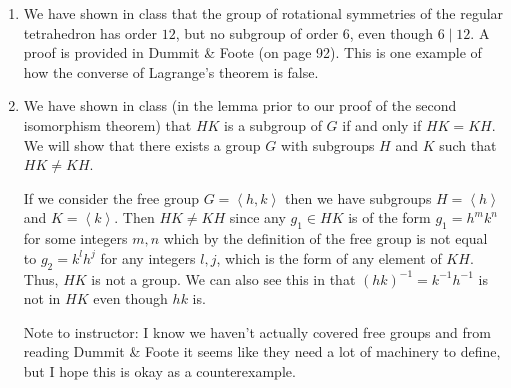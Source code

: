 \documentclass[12 pt, letterpaper]{hmcpset}
\begin{document}
\begin{solution}
\begin{enumerate}
			Since $H \trianglelefteq G$, $G/H$ is a group with the standard binary operation. Consider the projection $\pi : G \to G/H$ by $g \mapsto gH$. Notice that $gH = H = 1_{G/H}$ if and only if $g \in H$. Thus $\ker \pi = H$.
		\item {} 

			We have shown in class that the group of rotational symmetries of the regular tetrahedron has order $12$, but no subgroup of order $6$, even though $6 \mid 12$. A proof is provided in Dummit \& Foote (on page 92). This is one example of how the converse of Lagrange's theorem is false.
		\item {} 

			We have shown in class (in the lemma prior to our proof of the second isomorphism theorem) that $HK$ is a subgroup of $G$ if and only if $HK = KH$. We will show that there exists a group $G$ with subgroups $H$ and $K$ such that $HK \neq KH$. 

			If we consider the free group $G = \left < h, k \right >$ then we have subgroups $H = \left < h \right >$ and $K = \left < k \right >$. Then $HK \neq KH$ since any $g_{1} \in HK$ is of the form $g_{1} = h^{m} k^{n}$ for some integers $m, n$ which by the definition of the free group is not equal to $g_{2} = k^{l} h^{j}$ for any integers $l, j$, which is the form of any element of $KH$. Thus, $HK$ is not a group. We can also see this in that $(hk)^{-1} = k^{-1}h^{-1}$ is not in $HK$ even though $hk$ is. 

			Note to instructor: I know we haven't actually covered free groups and from reading Dummit \& Foote it seems like they need a lot of machinery to define, but I hope this is okay as a counterexample.
	\end{enumerate}
\end{solution}
\end{document}
